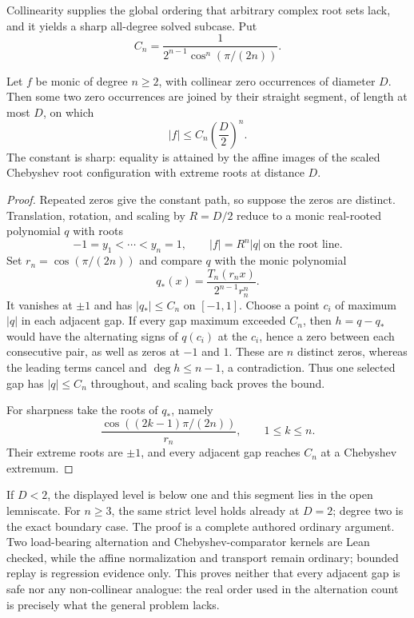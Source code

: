 \documentclass[11pt]{article}
\begin{document}
Collinearity supplies the global ordering that arbitrary complex root sets
lack, and it yields a sharp all-degree solved subcase.  Put
\[
 C_n=\frac{1}{2^{n-1}\cos^n(\pi/(2n))}.
\]

\begin{theorem}
\label{res:sharp-collinear-root-diameter}
Let $f$ be monic of degree $n\ge2$, with collinear zero occurrences of diameter
$D$.  Then some two zero occurrences are joined by their straight segment,
of length at most $D$, on which
\[
 |f|\le C_n\left(\frac D2\right)^n.
\]
The constant is sharp: equality is attained by the affine images of the
scaled Chebyshev root configuration with extreme roots at distance $D$.
\end{theorem}

\begin{proof}
Repeated zeros give the constant path, so suppose the zeros are distinct.
Translation, rotation, and scaling by $R=D/2$ reduce to a monic real-rooted
polynomial $q$ with roots
\[
 -1=y_1<\cdots<y_n=1,
 \qquad |f|=R^n|q|\ \text{on the root line}.
\]
Set $r_n=\cos(\pi/(2n))$ and compare $q$ with the monic polynomial
\[
 q_*(x)=\frac{T_n(r_nx)}{2^{n-1}r_n^n}.
\]
It vanishes at $\pm1$ and has $|q_*|\le C_n$ on $[-1,1]$.  Choose a point
$c_i$ of maximum $|q|$ in each adjacent gap.  If every gap maximum exceeded
$C_n$, then $h=q-q_*$ would have the alternating signs of $q(c_i)$ at the
$c_i$, hence a zero between each consecutive pair, as well as zeros at
$-1$ and $1$.  These are $n$ distinct zeros, whereas the leading terms cancel
and $\deg h\le n-1$, a contradiction.  Thus one selected gap has
$|q|\le C_n$ throughout, and scaling back proves the bound.

For sharpness take the roots of $q_*$, namely
\[
 \frac{\cos((2k-1)\pi/(2n))}{r_n},\qquad 1\le k\le n.
\]
Their extreme roots are $\pm1$, and every adjacent gap reaches $C_n$ at a
Chebyshev extremum.
\end{proof}

If $D<2$, the displayed level is below one and this segment lies in the open
lemniscate.  For $n\ge3$, the same strict level holds already at $D=2$;
degree two is the exact boundary case.  The proof is a complete authored
ordinary argument.  Two load-bearing alternation and Chebyshev-comparator
kernels are Lean checked, while the affine normalization and transport remain
ordinary; bounded replay is regression evidence only.  This proves neither
that every adjacent gap is safe nor any non-collinear analogue: the real order
used in the alternation count is precisely what the general problem lacks.
\end{document}
